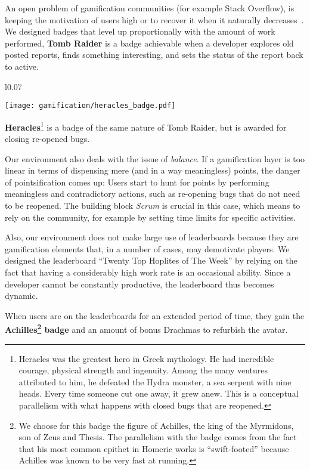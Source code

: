  An open problem of gamification communities (for example Stack Overflow), is keeping the motivation of users high or to recover it when it naturally decreases~\cite{Grant2013}.
We designed badges that level up proportionally with the amount of work performed, \eg \textbf{Tomb Raider} is a badge achievable when a developer explores old posted reports, finds something interesting, and sets the status of the report back to active.

\noindent
\begin{wrapfigure}{l}{0.07\textwidth}
  \vspace{-18pt}
  \begin{center}
    \texttt{[image: gamification/heracles\_badge.pdf]}
  \end{center}
  \vspace{-30pt}
\end{wrapfigure}
\textbf{Heracles}\footnote{Heracles was the greatest hero in Greek mythology.
He had incredible courage, physical strength and ingenuity.
Among the many ventures attributed to him, he defeated the Hydra monster, a sea serpent with nine heads.
Every time someone cut one away, it grew anew.
This is a conceptual parallelism with what happens with closed bugs that are reopened.} is a badge of the same nature of Tomb Raider, but is awarded for closing re-opened bugs.

Our environment also deals with the issue of {\em balance}.
If a gamification layer is too linear in terms of dispensing mere (and in a way meaningless) points, the danger of pointsification comes up: Users start to hunt for points by performing meaningless and contradictory actions, such as re-opening bugs that do not need to be reopened.
The building block {\em Scrum} is crucial in this case, which means to rely on the community, for example by setting time limits for specific activities.

Also, our environment does not make large use of leaderboards because they are gamification elements that, in a number of cases, may demotivate players.
We designed the leaderboard ``Twenty Top Hoplites of The Week'' by relying on the fact that having a considerably high work rate is an occasional ability.
Since a developer cannot be constantly productive, the leaderboard thus becomes dynamic.

 When users are on the leaderboards for an extended period of time, they gain the \textbf{Achilles\footnote{We choose for this badge the figure of Achilles, the king of the Myrmidons, son of Zeus and Thesis.
The parallelism with the badge comes from the fact that his most common epithet in Homeric works is ``swift-footed'' because Achilles was known to be very fast at running.} badge} and an amount of bonus Drachmas to refurbish the avatar.

